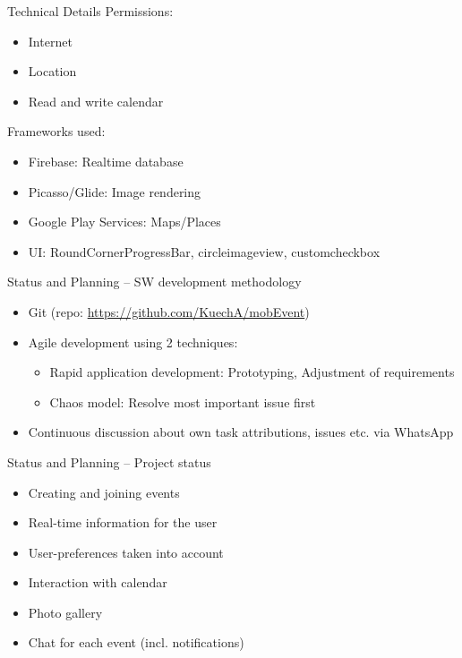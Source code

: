 \documentclass[logo=EURECOM,english]{eurecombeamer}
\begin{document}
\begin{frame}{Technical Details}
Permissions:
\begin{itemize}
\item Internet
\item Location
\item Read and write calendar\bigskip
\end{itemize}
Frameworks used:
\begin{itemize}
\item Firebase: Realtime database
\item Picasso/Glide: Image rendering
\item Google Play Services: Maps/Places
\item UI: RoundCornerProgressBar, circleimageview, customcheckbox
\end{itemize}
\end{frame}

\begin{frame}{Status and Planning -- SW development methodology}
\begin{itemize}
\item Git (repo: \url{https://github.com/KuechA/mobEvent})
\item Agile development using 2 techniques:
	\begin{itemize}
	\item Rapid application development: Prototyping, Adjustment of requirements
	\item Chaos model: Resolve most important issue first
	\end{itemize}
\item Continuous discussion about own task attributions, issues etc. via WhatsApp
\end{itemize}
\end{frame}

\begin{frame}{Status and Planning -- Project status}
\begin{itemize}
\item Creating and joining events
\item Real-time information for the user
\item User-preferences taken into account
\item Interaction with calendar
\item Photo gallery
\item Chat for each event (incl. notifications)
\end{itemize}
\end{frame}
\end{document}
